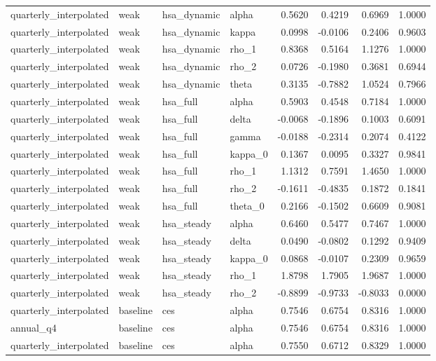\begin{tabular}{llllrrrr}
quarterly\_interpolated & weak & hsa\_dynamic & alpha & 0.5620 & 0.4219 & 0.6969 & 1.0000 \\
quarterly\_interpolated & weak & hsa\_dynamic & kappa & 0.0998 & -0.0106 & 0.2406 & 0.9603 \\
quarterly\_interpolated & weak & hsa\_dynamic & rho\_1 & 0.8368 & 0.5164 & 1.1276 & 1.0000 \\
quarterly\_interpolated & weak & hsa\_dynamic & rho\_2 & 0.0726 & -0.1980 & 0.3681 & 0.6944 \\
quarterly\_interpolated & weak & hsa\_dynamic & theta & 0.3135 & -0.7882 & 1.0524 & 0.7966 \\
quarterly\_interpolated & weak & hsa\_full & alpha & 0.5903 & 0.4548 & 0.7184 & 1.0000 \\
quarterly\_interpolated & weak & hsa\_full & delta & -0.0068 & -0.1896 & 0.1003 & 0.6091 \\
quarterly\_interpolated & weak & hsa\_full & gamma & -0.0188 & -0.2314 & 0.2074 & 0.4122 \\
quarterly\_interpolated & weak & hsa\_full & kappa\_0 & 0.1367 & 0.0095 & 0.3327 & 0.9841 \\
quarterly\_interpolated & weak & hsa\_full & rho\_1 & 1.1312 & 0.7591 & 1.4650 & 1.0000 \\
quarterly\_interpolated & weak & hsa\_full & rho\_2 & -0.1611 & -0.4835 & 0.1872 & 0.1841 \\
quarterly\_interpolated & weak & hsa\_full & theta\_0 & 0.2166 & -0.1502 & 0.6609 & 0.9081 \\
quarterly\_interpolated & weak & hsa\_steady & alpha & 0.6460 & 0.5477 & 0.7467 & 1.0000 \\
quarterly\_interpolated & weak & hsa\_steady & delta & 0.0490 & -0.0802 & 0.1292 & 0.9409 \\
quarterly\_interpolated & weak & hsa\_steady & kappa\_0 & 0.0868 & -0.0107 & 0.2309 & 0.9659 \\
quarterly\_interpolated & weak & hsa\_steady & rho\_1 & 1.8798 & 1.7905 & 1.9687 & 1.0000 \\
quarterly\_interpolated & weak & hsa\_steady & rho\_2 & -0.8899 & -0.9733 & -0.8033 & 0.0000 \\
quarterly\_interpolated & baseline & ces & alpha & 0.7546 & 0.6754 & 0.8316 & 1.0000 \\
annual\_q4 & baseline & ces & alpha & 0.7546 & 0.6754 & 0.8316 & 1.0000 \\
quarterly\_interpolated & baseline & ces & alpha & 0.7550 & 0.6712 & 0.8329 & 1.0000 \\

\end{tabular}
